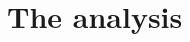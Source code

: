 \documentclass[12pt]{article}
\begin{document}
    
    

    
\section{The analysis}
\end{document}
